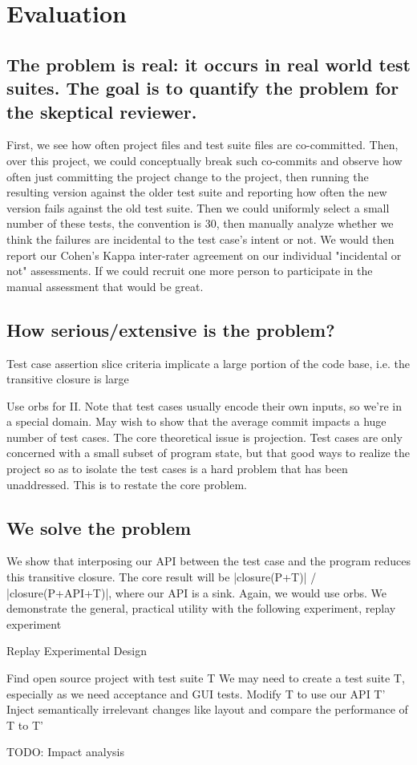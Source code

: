 \section{Evaluation}
\label{sec:eval}

\subsection{The problem is real: it occurs in real world test suites. The goal is to quantify the problem for the skeptical reviewer.}

First, we see how often project files and test suite files are co-committed.  Then, over this project, we could conceptually break such co-commits and observe how often just committing the project change to the project, then running the resulting version against the older test suite and reporting how often the new version fails against the old test suite.  Then we could uniformly select a small number of these tests, the convention is 30, then manually analyze whether we think the failures are incidental to the test case’s intent or not.  We would then report our Cohen’s Kappa inter-rater agreement on our individual "incidental or not" assessments.  If we could recruit one more person to participate in the manual assessment that would be great.

\subsection{How serious/extensive is the problem?}

Test case assertion slice criteria implicate a large portion of the code base, i.e. the transitive closure is large

Use orbs for II. Note that test cases usually encode their own inputs, so we’re in a special domain. May wish to show that the average commit impacts a huge number of test cases. The core theoretical issue is projection. Test cases are only concerned with a small subset of program state, but that good ways to realize the project so as to isolate the test cases is a hard problem that has been unaddressed. This is to restate the core problem.

\subsection{We solve the problem}

We show that interposing our API between the test case and the program reduces this transitive closure.  The core result will be |closure(P+T)| / |closure(P+API+T)|, where our API is a sink.  Again, we would use orbs.
We demonstrate the general, practical utility with the following experiment, replay experiment

Replay Experimental Design

Find open source project with test suite T
We may need to create a test suite T, especially as we need acceptance and GUI tests.
Modify T to use our API T'
Inject semantically irrelevant changes like layout and compare the performance of T to T’


TODO:  Impact analysis
